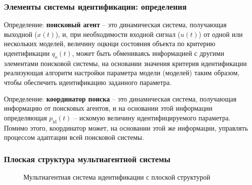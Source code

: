 \documentclass[10pt,utf8]{beamer}
\begin{document}
\begin{frame}
  \frametitle{Элементы системы идентификации: определения}

  Определение: \textbf{поисковый агент} -- это динамическая система, получающая выходной ($x(t)$),
  и, при необходимости входной сигнал ($u(t)$) от одной или нескольких моделей,
  величину оцкнци состояния объекта по критерию идентификации $q_o(t)$,
  может быть обмениваясь информацией с другими элементами поисковой системы,
  на основании значения критерия идентификации
  реализующая алгоритм настройки параметра модели (моделей)
  таким образом, чтобы обеспечить идентификацию заданного параметра.

  Определение: \textbf{координатор поиска} -- это динамическая система, получающая информацию
  от поисковых агентов, и на основании этой информации определяющая
  $p_{\mathrm{id}}(t)$ -- искомую величину идентифицируемого параметра.
  Помимо этого, координатор может, на основании этой же информации,
  управлять процессом адаптации всей поисковой системы.

\end{frame}




\begin{frame}[fragile]
  \frametitle{Плоская структура мультиагентной системы}

  \begin{figure}[ht!]
  \begin{center}
  
  \end{center}
  \caption{Мультиагентная система идентификации с плоской структурой}
  \label{atu:f:agents_flat}
  \end{figure}

\end{frame}



\end{document}
